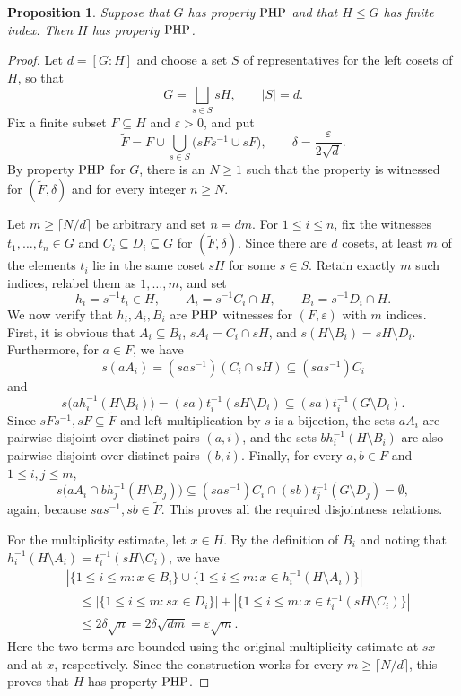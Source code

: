 \documentclass[11pt]{article}
\newtheorem{prop}[thm]{Proposition}
\theoremstyle{definition}
\theoremstyle{remark}
\numberwithin{equation}{section}
\numberwithin{equation}{section}
\numberwithin{equation}{section}
\begin{document}
\begin{prop}
    Suppose that $G$ has property ${\rm {PHP}}$ and that $H\leq G$ has finite index. Then $H$ has property ${\rm {PHP}}$.
\end{prop}
\begin{proof}
    Let $d=[G:H]$ and choose a set $S$ of representatives for the left cosets of $H$, so that
$$
  G=\bigsqcup_{s\in S}sH,
  \qquad |S|=d.
$$
Fix a finite subset $F\subseteq H$ and $\varepsilon>0$, and put
$$
  \widetilde F
  =F\cup\bigcup_{s\in S}\bigl(sFs^{-1}\cup sF\bigr),
  \qquad
  \delta=\frac{\varepsilon}{2\sqrt d}.
$$
By property ${\rm {PHP}}$ for $G$, there is an $N\geq1$ such that the property is witnessed for $(\widetilde F,\delta)$ and for every integer $n\geq N$.

Let $m\geq\lceil N/d\rceil$ be arbitrary and set $n=dm$. For $1\leq i\leq n$, fix the witnesses $t_1,\ldots,t_n\in G$ and $C_i\subseteq D_i\subseteq G$ for $(\widetilde F,\delta)$. Since there are $d$ cosets, at least $m$ of the elements $t_i$ lie in the same coset $sH$ for some $s\in S$. Retain exactly $m$ such indices, relabel them as $1,\ldots,m$, and set
$$
  h_i=s^{-1}t_i\in H, \qquad A_i=s^{-1}C_i\cap H, \qquad B_i=s^{-1}D_i\cap H.
$$
We now verify that $h_i,A_i,B_i$ are ${\rm {PHP}}$ witnesses for $(F,\varepsilon)$ with $m$ indices. First, it is obvious that $A_i\subseteq B_i$, $sA_i=C_i\cap sH$, and $s(H\setminus B_i)=sH\setminus D_i$. Furthermore, for $a\in F$, we have
$$
  s(aA_i)=(sas^{-1})(C_i\cap sH)\subseteq(sas^{-1})C_i
$$
and 
$$
s\bigl(ah_i^{-1}(H\setminus B_i)\bigr)=(sa)t_i^{-1}(sH\setminus D_i)\subseteq (sa)t_i^{-1}(G\setminus D_i).
$$
Since $sFs^{-1},sF\subseteq \widetilde F$ and left multiplication by $s$ is a bijection, the sets $aA_i$ are pairwise disjoint over distinct pairs $(a,i)$, and the sets $b h_i^{-1}(H\setminus B_i)$ are also pairwise disjoint over distinct pairs $(b,i)$. Finally, for every $a,b\in F$ and $1\leq i,j\leq m$,
$$
  s\bigl(aA_i\cap b h_j^{-1}(H\setminus B_j)\bigr)\subseteq (sas^{-1})C_i\cap(sb)t_j^{-1}(G\setminus D_j)=\emptyset,
$$
again, because $sas^{-1},sb\in\widetilde F$. This proves all the required disjointness relations.

For the multiplicity estimate, let $x\in H$. By the definition of $B_i$ and noting that $h_i^{-1}(H\setminus A_i)=t_i^{-1}(sH\setminus C_i)$, we have
\begin{align*}
  &\left|\{1\leq i\leq m:x\in B_i\}\cup\{1\leq i\leq m:x\in h_i^{-1}(H\setminus A_i)\}\right|    \\
  &\quad\leq |\{1\leq i\leq m:sx\in D_i\}|+|\{1\leq i\leq m:x\in t_i^{-1}(sH\setminus C_i)\}|   \\
  &\quad\leq 2\delta\sqrt n
    =2\delta\sqrt{dm}=\varepsilon\sqrt m.
\end{align*}
Here the two terms are bounded using the original multiplicity estimate at $sx$ and at $x$, respectively. Since the construction works for every $m\geq\lceil N/d\rceil$, this proves that $H$ has property ${\rm {PHP}}$.
\end{proof}
\end{document}
